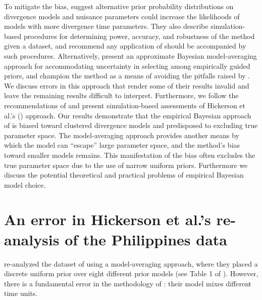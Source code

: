 
To mitigate the bias, \citet{Oaks2012} suggest alternative prior probability
distributions on divergence models and nuisance parameters could increase the
likelihoods of models with more divergence time parameters.
They also describe simulation-based procedures for determining power, accuracy,
and robustness of the method given a dataset, and recommend any application of
\msb should be accompanied by such procedures.
Alternatively, \citet{Hickerson2013} present an approximate Bayesian
model-averaging approach for accommodating uncertainty in selecting among
empirically guided priors, and champion the method as a means of avoiding the
pitfalls raised by \citet{Oaks2012}.
We discuss errors in this approach that render some of their results invalid
and leave the remaining results difficult to interpret.
Furthermore, we follow the recommendations of \citet{Oaks2012} and present
simulation-based assessments of Hickerson et al.'s (\citeyear{Hickerson2013})
approach.
Our results demonstrate that the empirical Bayesian approach of
\citet{Hickerson2013} is biased toward clustered divergence models and
predisposed to excluding true parameter space.
The model-averaging approach provides another means by which the model can
``escape'' large parameter space, and the method's bias toward smaller models
remains.
This manifestation of the bias often excludes the true parameter space due to
the use of narrow uniform priors.
Furthermore we discuss the potential theoretical and practical problems of
empirical Bayesian model choice.


\section*{An error in Hickerson et al.'s re-analysis of the Philippines data}
\citet{Hickerson2013} re-analyzed the dataset of \citet{Oaks2012} using a
model-averaging approach, where they placed a discrete uniform prior over eight
different prior models (see Table 1 of \citet{Hickerson2013}).
However, there is a fundamental error in the methodology of
\citet{Hickerson2013}: their model mixes different time units.

